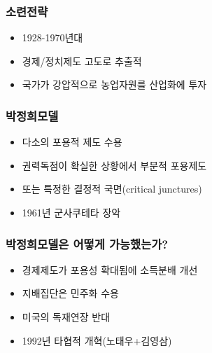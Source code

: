 \documentclass[xcolor=pdftex,dvipsnames]{beamer}
\renewcommand{\(}{\left(}
\renewcommand{\)}{\right)}
\begin{document}
\begin{frame}
\frametitle{소련전략} 
\begin{itemize}
\item 1928-1970년대 
\item 경제/정치제도 고도로  추출적
\item 국가가 강압적으로 농업자원를 산업화에 투자
\end{itemize}
\end{frame}

\begin{frame}
\frametitle{박정희모델} 
\begin{itemize}
\item 다소의 포용적 제도 수용
\item 권력독점이 확실한 상황에서 부분적 포용제도
\item 또는 특정한 결정적 국면(critical junctures)
\item 1961년 군사쿠테타 장악
\end{itemize}
\end{frame}

\begin{frame}
\frametitle{박정희모델은 어떻게 가능했는가?} 
\begin{itemize}
\item 경제제도가 포용성 확대됨에 소득분배 개선
\item 지배집단은 민주화 수용
\item 미국의 독재연장 반대
\item 1992년 타협적 개혁(노태우+김영삼)
\end{itemize}
\end{frame}
\end{document}
